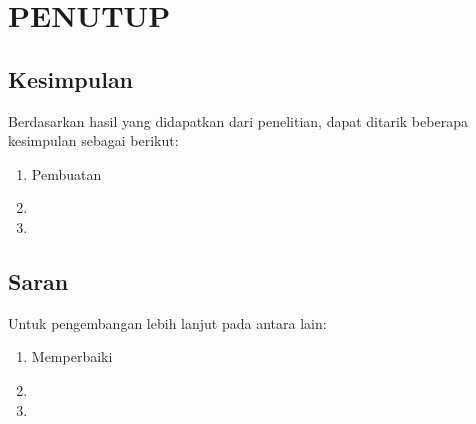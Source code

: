 \chapter{PENUTUP}
\label{chap:penutup}


\section{Kesimpulan}
\label{sec:kesimpulan}

Berdasarkan hasil yang didapatkan dari penelitian, dapat ditarik beberapa kesimpulan sebagai berikut:

\begin{enumerate}[nolistsep]

  \item Pembuatan \lipsum[2][1-3]

  \item \lipsum[2][4-6]

  \item \lipsum[2][7-10]

\end{enumerate}

\section{Saran}
\label{chap:saran}

Untuk pengembangan lebih lanjut pada \lipsum[1][1-3] antara lain:

\begin{enumerate}[nolistsep]

  \item Memperbaiki \lipsum[2][1-3]

  \item \lipsum[2][4-6]

  \item \lipsum[2][7-10]

\end{enumerate}
